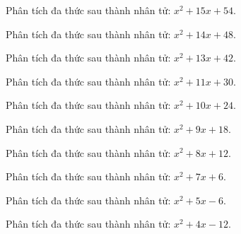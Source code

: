\begin{bt}
	Phân tích đa thức sau thành nhân tử: $x^2 + 15 x + 54$.
\end{bt}
\begin{bt}
	Phân tích đa thức sau thành nhân tử: $x^2 + 14 x + 48$.
\end{bt}
\begin{bt}
	Phân tích đa thức sau thành nhân tử: $x^2 + 13 x + 42$.
\end{bt}
\begin{bt}
	Phân tích đa thức sau thành nhân tử: $x^2 + 11 x + 30$.
\end{bt}
\begin{bt}
	Phân tích đa thức sau thành nhân tử: $x^2 + 10 x + 24$.
\end{bt}
\begin{bt}
	Phân tích đa thức sau thành nhân tử: $x^2 + 9 x + 18$.
\end{bt}
\begin{bt}
	Phân tích đa thức sau thành nhân tử: $x^2 + 8 x + 12$.
\end{bt}
\begin{bt}
	Phân tích đa thức sau thành nhân tử: $x^2 + 7 x + 6$.
\end{bt}
\begin{bt}
	Phân tích đa thức sau thành nhân tử: $x^2 + 5 x - 6$.
\end{bt}
\begin{bt}
	Phân tích đa thức sau thành nhân tử: $x^2 + 4 x - 12$.
\end{bt}
